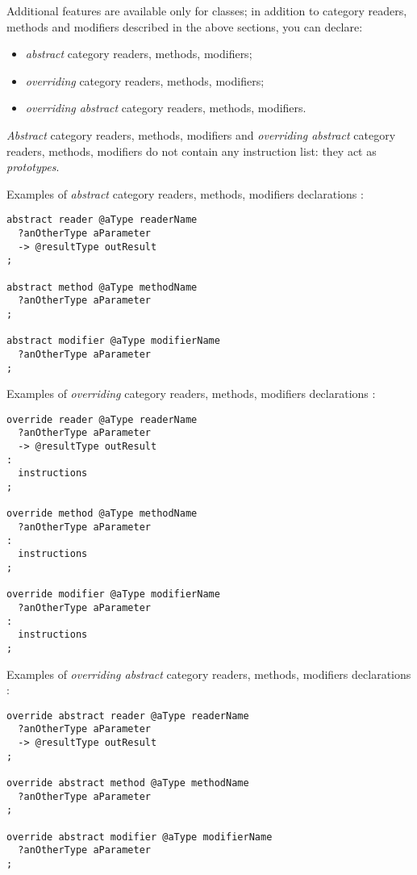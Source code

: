 

Additional features are available only for classes; in addition to category readers, methods and modifiers described in the above sections, you can declare:
\begin{itemize}
\item \emph{abstract} category readers, methods, modifiers;
\item \emph{overriding} category readers, methods, modifiers;
\item \emph{overriding abstract} category readers, methods, modifiers.
\end{itemize}

\emph{Abstract} category readers, methods, modifiers and \emph{overriding abstract} category readers, methods, modifiers do not contain any instruction list: they act as \emph{prototypes}.

Examples of \emph{abstract} category readers, methods, modifiers declarations :
{
\begin{lstlisting}[language=galgas]
abstract reader @aType readerName
  ?anOtherType aParameter
  -> @resultType outResult
;

abstract method @aType methodName
  ?anOtherType aParameter
;

abstract modifier @aType modifierName
  ?anOtherType aParameter
;
\end{lstlisting}
}

Examples of \emph{overriding} category readers, methods, modifiers declarations :
{
\begin{lstlisting}[language=galgas]
override reader @aType readerName
  ?anOtherType aParameter
  -> @resultType outResult
:
  instructions
;

override method @aType methodName
  ?anOtherType aParameter
:
  instructions
;

override modifier @aType modifierName
  ?anOtherType aParameter
:
  instructions
;
\end{lstlisting}
}

Examples of \emph{overriding abstract} category readers, methods, modifiers declarations :
{
\begin{lstlisting}[language=galgas]
override abstract reader @aType readerName
  ?anOtherType aParameter
  -> @resultType outResult
;

override abstract method @aType methodName
  ?anOtherType aParameter
;

override abstract modifier @aType modifierName
  ?anOtherType aParameter
;
\end{lstlisting}
}


